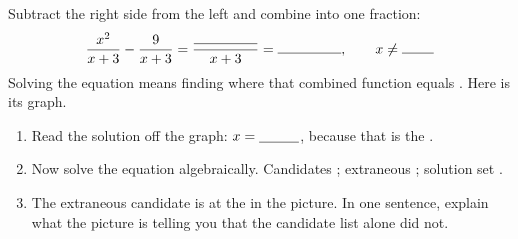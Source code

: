 \documentclass[10pt]{article}
\newcommand{\lgrid}[4]{%
  \draw[step=1, linegray!40, very thin] (#1,#3) grid (#2,#4);
  \draw[->, semithick, charcoal] (#1,0)--(#2,0) node[below right, font=\scriptsize]{$x$};
  \draw[->, semithick, charcoal] (0,#3)--(0,#4) node[left, font=\scriptsize]{$y$};}
\begin{document}
\begin{tcolorbox}[colback=white, colframe=black!40, title=\textbf{Tier A --- Approaching Proficiency},
    fonttitle=\bfseries, arc=1.5mm, left=3mm, right=3mm, top=2mm, bottom=2mm, breakable]
\vspace{2pt}
Subtract the right side from the left and combine into one fraction:
\[ \frac{x^2}{x+3}-\frac{9}{x+3}=\frac{\rule{1.6cm}{0.4pt}}{x+3}
   =\rule{1.6cm}{0.4pt},\qquad x\neq\rule{0.8cm}{0.4pt} \]
Solving the equation means finding where that combined function equals \blank{0.8cm}. Here is its
graph.
\begin{center}
\end{center}
\vspace{-4pt}
\begin{enumerate}[label=(\alph*), leftmargin=2.1em, itemsep=5pt]
  \item Read the solution off the graph: $x=\blank{1.0cm}$, because that is the \blank{2.4cm}.
  \item Now solve the equation algebraically. Candidates \blank{2.2cm}; extraneous \blank{1.2cm};
        solution set \blank{1.8cm}.
  \item The extraneous candidate is at the \blank{1.4cm} in the picture. In one sentence, explain
        what the picture is telling you that the candidate list alone did not. \writeline
\end{enumerate}


\end{tcolorbox}
\end{document}

